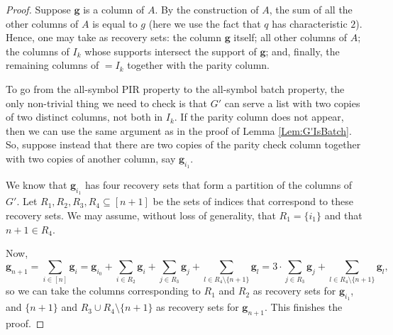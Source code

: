 \documentclass[11pt,a4paper]{article}
\theoremstyle{definition}
\newcommand{\bfe}{{\boldsymbol e}}
\newcommand{\bfg}{{\boldsymbol g}}
\begin{document}
\begin{proof}
    
    Suppose $\bfg$ is a column of $A$.
    By the construction of $A$, the sum of all the other columns of $A$ is equal to $g$ (here we use the fact that $q$ has characteristic $2$).  Hence, one may take as recovery sets: the column $\bfg$ itself; all other columns of $A$; the columns of $I_k$ whose supports intersect the support of $\bfg$; and, finally, the remaining columns of  $=I_k$ together with the parity column.   

    To go from the all-symbol PIR property to the all-symbol batch property, the only non-trivial thing we need to check is that $G'$ can serve a list with two copies of two distinct columns, not both in $I_k$. If the parity column does not appear, then we can use the same argument as in the proof of Lemma \ref{Lem:G'IsBatch}. So, suppose instead that there are two copies of the parity check column together with two copies of another column, say $\bfg_{i_1}$. 
    
    We know that $\bfg_{i_1}$ has four recovery sets that form a partition of the columns of $G'$. Let $R_1,R_2,R_3,R_4\subseteq [n+1]$ be the sets of indices that correspond to these recovery sets. We may assume, without loss of generality, that $R_1 = \{i_1\}$ and that $n+1\in R_4$.

    Now, 
    $$
        \bfg_{n+1} = \sum_{i \in [n]} \bfg_i  = \bfg_{i_0} + \sum_{i\in R_2}\bfg_i + \sum_{j\in R_3}\bfg_j + \sum_{l \in R_4\setminus\{n+1\}} \bfg_l = 3\cdot\sum_{j\in R_3}\bfg_j + \sum_{l \in R_4\setminus\{n+1\}} \bfg_l,
    $$
    so we can take the columns corresponding to $R_1$ and $R_2$ as recovery sets for $\bfg_{i_1}$, and $\{n+1\}$ and $R_3 \cup R_4\setminus \{n+1\}$ as recovery sets for $\bfg_{n+1}$. This finishes the proof.
\end{proof}
\end{document}
